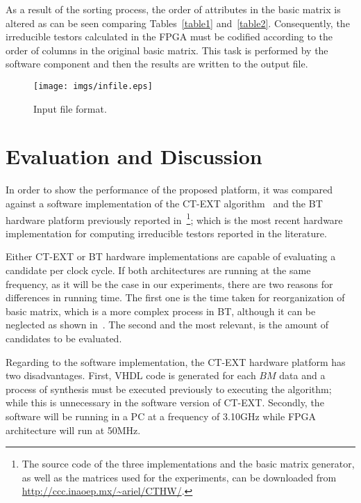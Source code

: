 \documentclass[letterpaper, twoside, openright, 12pt]{book}%
\begin{document}
	As a result of the sorting process, the order of attributes in the basic matrix is altered as can be seen comparing Tables~\ref{table1} and~\ref{table2}. Consequently, the irreducible testors calculated in the FPGA must be codified according to the order of columns in the original basic matrix. This task is performed by the software component and then the results are written to the output file.

	\begin{figure}[htb]
	    \begin{center}
	       \texttt{[image: imgs/infile.eps]}
	    \end{center}
	\caption{Input file format.}
	\label{fig:8}
	\end{figure}
	
\section{Evaluation and Discussion} \label{sec:evaluationHardware}
	In order to show the performance of the proposed platform, it was compared against a software implementation of the CT-EXT algorithm~\citep{Sanchez07} and the BT hardware platform previously reported in~\citep{Rodriguez14}\footnote{The source code of the three implementations and the basic matrix generator, as well as the matrices used for the experiments, can be downloaded from \url{http://ccc.inaoep.mx/~ariel/CTHW/}.}; which is the most recent hardware implementation for computing irreducible testors reported in the literature.
	
	Either CT-EXT or BT hardware implementations are capable of evaluating a candidate per clock cycle. If both architectures are running at the same frequency, as it will be the case in our experiments, there are two reasons for differences in running time. The first one is the time taken for reorganization of basic matrix, which is a more complex process in BT, although it can be neglected as shown in~\citep{Rojas12}. The second and the most relevant, is the amount of candidates to be evaluated. 
	
	Regarding to the software implementation, the CT-EXT hardware platform has two disadvantages. First, VHDL code is generated for each $BM$ data and a process of synthesis must be executed previously to executing the algorithm; while this is unnecessary in the software version of CT-EXT. Secondly, the software will be running in a PC at a frequency of 3.10GHz while FPGA architecture will run at 50MHz. 
	
\end{document}
